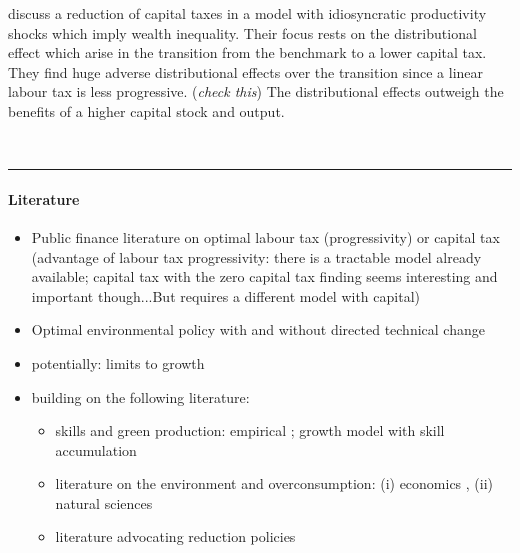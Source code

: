 \cite{Domeij2004OnTaxes} discuss a reduction of capital taxes in a model with idiosyncratic productivity shocks which imply  wealth inequality. Their focus rests on the distributional effect which arise in the transition from the benchmark to a lower capital tax. They find huge adverse distributional effects over the transition since a linear labour tax is less progressive.  (\textit{check this}) The distributional effects outweigh the benefits of a higher capital stock and output. 

\\

\noindent\rule[1ex]{\textwidth}{1pt}

\paragraph{Literature}
\begin{itemize}
\item Public finance literature on optimal labour tax (progressivity) or capital tax (advantage of labour tax progressivity: there is a tractable model already available; capital tax with the zero capital tax finding seems interesting and important though...But requires a different model with capital) \citep{Heathcote2017OptimalFramework, Conesa2009TaxingAll, Domeij2004OnTaxes}
\item Optimal environmental policy with and without directed technical change \citep{Acemoglu2012TheChange, Acemoglu2016TransitionTechnology, Fried2018ClimateAnalysis, Barrage2019OptimalPolicy, Golosov2014OptimalEquilibrium, Hassler2016EnvironmentalMacroeconomics}
\item potentially: limits to growth \citep{Stokey1998AreGrowth, Jones2016LifeGrowth, Arrow2004AreMuch}
\item building on the following literature: \begin{itemize}
\item skills and green production: empirical \citep{Consoli2016DoCapital, Bowen2018CharacterisingComposition, Borissov2019CarbonDevelopment}; growth model with skill accumulation \citep{Borissov2019CarbonDevelopment}
\item literature on the environment and overconsumption: (i) economics \citep{Dasgupta2021, Brock2005ChapterEmpirics, Arrow2004AreMuch, Cohen2019AnnualSubstitutable}, (ii) natural sciences \citep{ Rockstrom2009AHumanity, Rogelj2018MitigationDevelopment.}
\item literature advocating reduction policies \citep{Schor2005SustainableReduction, Pullinger2014WorkingDesign}

\end{itemize}
\end{itemize}

